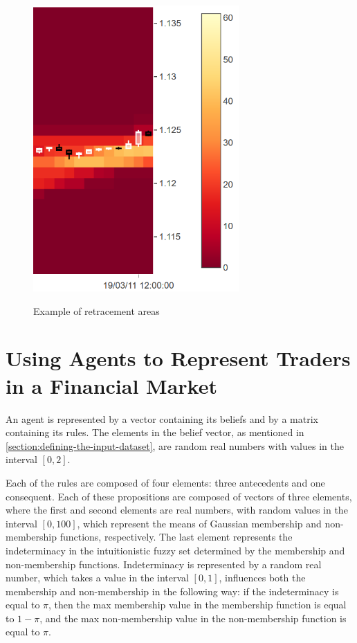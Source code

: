 \begin{figure}
\caption{Example of retracement areas} \centering
\includegraphics[width=0.7\textwidth]{img/retracement-areas.png}
\label{figure:example-of-retracement-areas}
\end{figure}

\section{Using Agents to Represent Traders in a Financial Market}
\label{section:using-agents-to-represent-traders-in-a-financial-market:implementation}

An agent is represented by a vector containing its beliefs and by a matrix
containing its rules. The elements in the belief vector, as mentioned in
\ref{section:defining-the-input-dataset}, are random real numbers with values in
the interval $[0, 2]$.

Each of the rules are composed of four elements: three antecedents and one
consequent. Each of these propositions are composed of vectors of three
elements, where the first and second elements are real numbers, with random
values in the interval $[0, 100]$, which represent the means of Gaussian
membership and non-membership functions, respectively. The last element
represents the indeterminacy in the intuitionistic fuzzy set determined by the
membership and non-membership functions. Indeterminacy is represented by a
random real number, which takes a value in the interval $[0, 1]$, influences
both the membership and non-membership in the following way: if the
indeterminacy is equal to $\pi$, then the max membership value in the membership
function is equal to $1 - \pi$, and the max non-membership value in the
non-membership function is equal to $\pi$.

